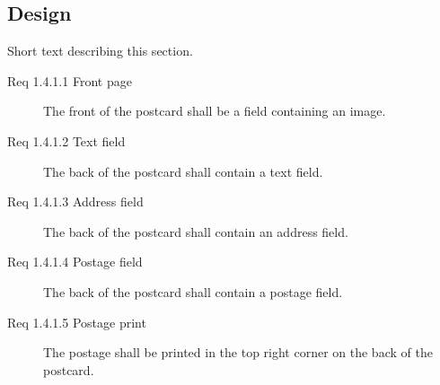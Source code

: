 \documentclass[10pt,a4paper]{article}
\begin{document}
\subsection{Design}
Short text describing this section.
\begin {description}
\item [Req 1.4.1.1 Front page] The front of the postcard shall be a field containing an image.
\item [Req 1.4.1.2 Text field] The back of the postcard shall contain a text field.
\item [Req 1.4.1.3 Address field] The back of the postcard shall contain an address field.
\item [Req 1.4.1.4 Postage field] The back of the postcard shall contain a postage field. 
\item [Req 1.4.1.5 Postage print] The postage shall be printed in the top right corner on the back of the postcard. 


\end{description}
\end{document}
